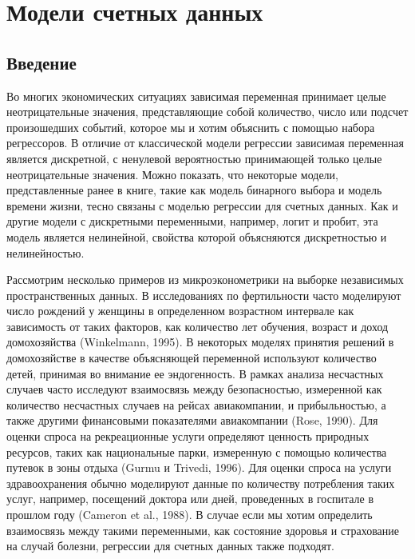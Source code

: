 

\chapter{ Модели счетных данных}


\section{Введение}\label{sec:20.1}

\noindent
Во многих экономических ситуациях зависимая переменная принимает целые неотрицательные значения, представляющие собой количество, число или подсчет произошедших событий, которое мы и хотим объяснить с помощью набора регрессоров. В отличие от классической модели регрессии зависимая переменная является дискретной, с ненулевой вероятностью принимающей только целые неотрицательные значения. Можно показать, что некоторые модели, представленные ранее в книге, такие как модель бинарного выбора и модель времени жизни, тесно связаны с моделью регрессии для счетных данных. Как и другие модели с дискретными переменными, например, логит и пробит, эта модель является нелинейной, свойства которой объясняются дискретностью и нелинейностью.

Рассмотрим несколько примеров из микроэконометрики на выборке независимых пространственных данных. В исследованиях по фертильности часто моделируют число рождений у женщины в определенном возрастном интервале как зависимость от таких факторов, как количество лет обучения, возраст и доход домохозяйства (Winkelmann, 1995). В некоторых моделях принятия решений в домохозяйстве в качестве объясняющей переменной используют количество детей, принимая во внимание ее эндогенность. В рамках анализа несчастных случаев часто исследуют взаимосвязь между безопасностью, измеренной как количество несчастных случаев на рейсах авиакомпании, и прибыльностью, а также другими финансовыми показателями авиакомпании (Rose, 1990). Для оценки спроса на рекреационные услуги определяют ценность природных ресурсов, таких как национальные парки, измеренную с помощью количества путевок в зоны отдыха (Gurmu и Trivedi, 1996). Для оценки спроса на услуги здравоохранения обычно моделируют данные по количеству потребления таких услуг, например, посещений доктора или дней, проведенных в госпитале в прошлом году (Cameron et al., 1988). В случае если мы хотим определить взаимосвязь между такими переменными, как состояние здоровья и страхование на случай болезни, регрессии для счетных данных также подходят.

